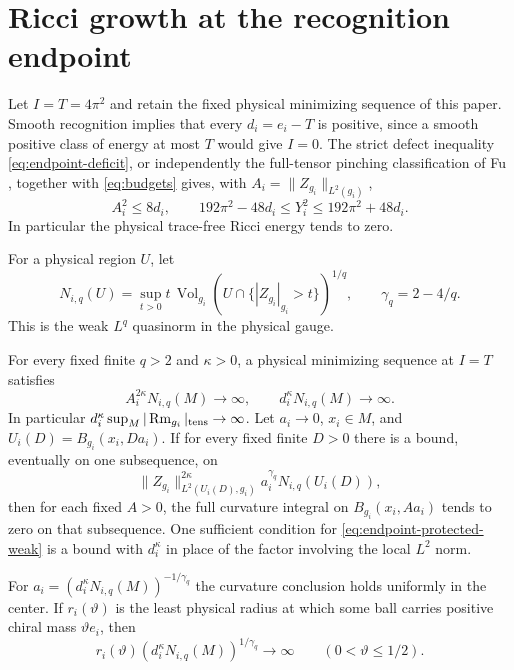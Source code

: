 \section{Ricci growth at the recognition endpoint}\label{sec:endpoint-windows}

Let \(I=T=4\pi^2\) and retain the fixed physical minimizing
sequence of this paper. Smooth recognition implies that every
\(d_i=e_i-T\) is positive, since a smooth positive class of energy
at most \(T\) would give \(I=0\). The strict defect inequality
\eqref{eq:endpoint-deficit}, or independently the full-tensor
pinching classification of Fu \cite[Theorem 1.3]{Fu2018FourManifolds},
together with \eqref{eq:budgets} gives, with \(A_i=\|Z_{g_i}\|_{L^2(g_i)}\),
\begin{equation}\label{eq:endpoint-ricci-defect}
 A_i^2\le 8d_i,\qquad
 192\pi^2-48d_i\le Y_i^2\le192\pi^2+48d_i .
\end{equation}
In particular the physical trace-free Ricci energy tends to zero.

For a physical region \(U\), let
\[
 N_{i,q}(U)=\sup_{t>0}t\,\operatorname{Vol}_{g_i}
      (U\cap\{|Z_{g_i}|_{g_i}>t\})^{1/q},\qquad
 \gamma_q=2-4/q .
\]
This is the weak \(L^q\) quasinorm in the physical gauge.

\begin{proposition}
\label{prop:endpoint-ricci-windows}
For every fixed finite \(q>2\) and \(\kappa>0\), a physical
minimizing sequence at \(I=T\) satisfies
\[
 A_i^{2\kappa}N_{i,q}(M)\longrightarrow\infty,\qquad
 d_i^\kappa N_{i,q}(M)\longrightarrow\infty.
\]
In particular \(d_i^\kappa\sup_M|\operatorname{Rm}_{g_i}|_{\rm tens}\to\infty\).
Let \(a_i\to0\), \(x_i\in M\), and
\(U_i(D)=B_{g_i}(x_i,Da_i)\). If for every fixed finite \(D>0\)
there is a bound, eventually on one subsequence, on
\begin{equation}\label{eq:endpoint-protected-weak}
 \|Z_{g_i}\|_{L^2(U_i(D),g_i)}^{2\kappa}
       a_i^{\gamma_q}N_{i,q}(U_i(D)),
\end{equation}
then for each fixed \(A>0\), the full curvature integral on
\(B_{g_i}(x_i,Aa_i)\) tends to zero on that subsequence. One
sufficient condition for \eqref{eq:endpoint-protected-weak} is a
bound with \(d_i^\kappa\) in place of the factor involving the
local \(L^2\) norm.

For \(a_i=(d_i^\kappa N_{i,q}(M))^{-1/\gamma_q}\) the curvature
conclusion holds uniformly in the center. If \(r_i(\vartheta)\)
is the least physical radius at which some ball carries positive
chiral mass \(\vartheta e_i\), then
\[
 r_i(\vartheta)(d_i^\kappa N_{i,q}(M))^{1/\gamma_q}
     \longrightarrow\infty\qquad (0<\vartheta\le1/2).
\]
\end{proposition}

